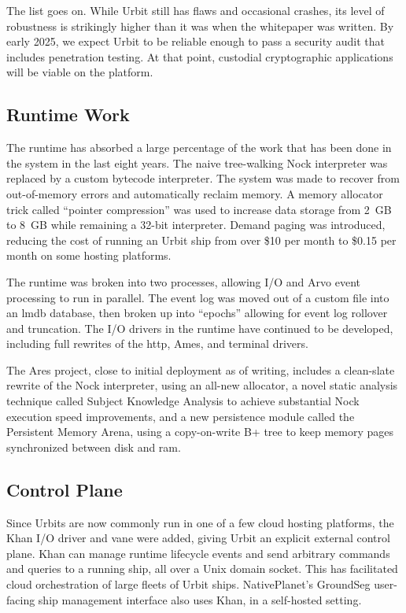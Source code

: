 \documentclass[twoside]{article}
\begin{document}
The list goes on.  While Urbit still has flaws and occasional crashes, its level of robustness is strikingly higher than it was when the whitepaper was written.  By early 2025, we expect Urbit to be reliable enough to pass a security audit that includes penetration testing.  At that point, custodial cryptographic applications will be viable on the platform.

\subsection{Runtime Work}

The runtime has absorbed a large percentage of the work that has been done in the system in the last eight years.  The naive tree-walking Nock interpreter was replaced by a custom bytecode interpreter.  The system was made to recover from out-of-memory errors and automatically reclaim memory.  A memory allocator trick called ``pointer compression'' was used to increase data storage from 2~GB to 8~GB while remaining a 32-bit interpreter.  Demand paging was introduced, reducing the cost of running an Urbit ship from over \$10 per month to \$0.15 per month on some hosting platforms.

The runtime was broken into two processes, allowing I/O and Arvo event processing to run in parallel.  The event log was moved out of a custom file into an {\sc lmdb} database, then broken up into ``epochs'' allowing for event log rollover and truncation.  The I/O drivers in the runtime have continued to be developed, including full rewrites of the {\sc http}, Ames, and terminal drivers.  

The Ares project, close to initial deployment as of writing, includes a clean-slate rewrite of the Nock interpreter, using an all-new allocator, a novel static analysis technique called Subject Knowledge Analysis to achieve substantial Nock execution speed improvements, and a new persistence module called the Persistent Memory Arena, using a copy-on-write B+ tree to keep memory pages synchronized between disk and {\sc ram}.

\subsection{Control Plane}

Since Urbits are now commonly run in one of a few cloud hosting platforms, the Khan I/O driver and vane were added, giving Urbit an explicit external control plane.  Khan can manage runtime lifecycle events and send arbitrary commands and queries to a running ship, all over a Unix domain socket.  This has facilitated cloud orchestration of large fleets of Urbit ships.  NativePlanet's GroundSeg user-facing ship management interface \citep{GroundSeg} also uses Khan, in a self-hosted setting.
\end{document}
